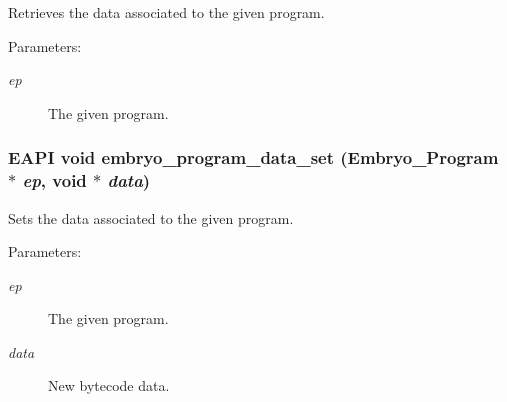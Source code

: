 Retrieves the data associated to the given program. 

\begin{Desc}
\item[Parameters:]
\begin{description}
\item[{\em ep}]The given program. \end{description}
\end{Desc}
\hypertarget{group__Embryo__Program__Data__Group_g235c1f64a597073ecc56e560c7e7f0a6}{
\subsubsection{\setlength{\rightskip}{0pt plus 5cm}EAPI void embryo\_\-program\_\-data\_\-set (Embryo\_\-Program $\ast$ {\em ep}, \/  void $\ast$ {\em data})}}
\label{group__Embryo__Program__Data__Group_g235c1f64a597073ecc56e560c7e7f0a6}


Sets the data associated to the given program. 

\begin{Desc}
\item[Parameters:]
\begin{description}
\item[{\em ep}]The given program. \item[{\em data}]New bytecode data. \end{description}
\end{Desc}
